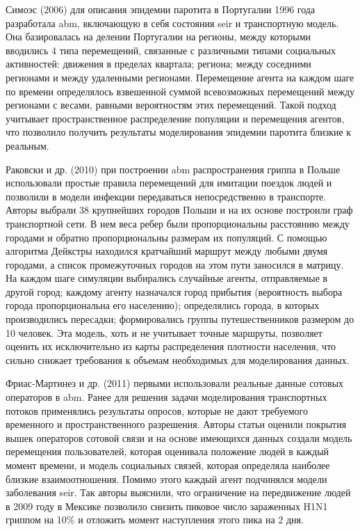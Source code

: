 \documentclass[a4paper,12pt]{article} %
\begin{document}
Симоэс (2006) \cite{simoes2006modelling} для описания эпидемии паротита в Португалии 1996 года разработала \gls{abm}, включающую в себя состояния \gls{seir} и транспортную модель. Она базировалась на делении Португалии на регионы, между которыми вводились 4 типа перемещений, связанные с различными типами социальных активностей: движения в пределах квартала; региона; между соседними регионами и между удаленными регионами. Перемещение агента на каждом шаге по времени определялось взвешенной суммой всевозможных перемещений между регионами с весами, равными вероятностям этих перемещений. Такой подход учитывает пространственное распределение популяции и перемещения агентов, что позволило получить результаты моделирования эпидемии паротита близкие к реальным.

Раковски и др. (2010) \cite{rakowski2010influenza} при построении \gls{abm} распространения гриппа в Польше использовали простые правила перемещений для имитации поездок людей и позволили в модели инфекции передаваться непосредственно в транспорте. Авторы выбрали 38 крупнейших городов Польши и на их основе построили граф транспортной сети. В нем веса ребер были пропорциональны расстоянию между городами и обратно пропорциональны размерам их популяций. С помощью алгоритма Дейкстры находился кратчайший маршрут между любыми двумя городами, а список промежуточных городов на этом пути заносился в матрицу. На каждом шаге симуляции выбирались случайные агенты, отправляемые в другой город; каждому агенту назначался город прибытия (вероятность выбора города пропорциональна его населению); определялись города, в которых производились пересадки; формировались группы путешественников размером до 10 человек. Эта модель, хоть и не учитывает точные маршруты, позволяет оценить их исключительно из карты распределения плотности населения, что сильно снижает требования к объемам необходимых для моделирования данных.

Фриас-Мартинез и др. (2011) \cite{frias2011agent} первыми использовали реальные данные сотовых операторов в \gls{abm}. Ранее для решения задачи моделирования транспортных потоков применялись результаты опросов, которые не дают требуемого временного и пространственного разрешения. Авторы статьи оценили покрытия вышек операторов сотовой связи и на основе имеющихся данных создали модель перемещения пользователей, которая оценивала положение людей в каждый момент времени, и модель социальных связей, которая определяла наиболее близкие взаимоотношения. Помимо этого каждый агент подчинялся модели заболевания \gls{seir}. Так авторы выяснили, что ограничение на передвижение людей в 2009 году в Мексике позволило снизить пиковое число зараженных H1N1 гриппом на 10\% и отложить момент наступления этого пика на 2 дня.
\end{document}
